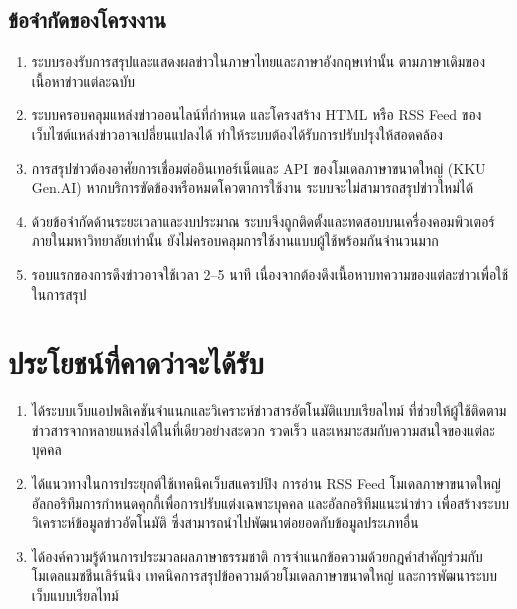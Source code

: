 \subsection{ข้อจำกัดของโครงงาน}

\begin{enumerate}[label=\arabic*)]
    \item ระบบรองรับการสรุปและแสดงผลข่าวในภาษาไทยและภาษาอังกฤษเท่านั้น ตามภาษาเดิมของเนื้อหาข่าวแต่ละฉบับ
    \item ระบบครอบคลุมแหล่งข่าวออนไลน์ที่กำหนด และโครงสร้าง HTML หรือ RSS Feed ของเว็บไซต์แหล่งข่าวอาจเปลี่ยนแปลงได้ ทำให้ระบบต้องได้รับการปรับปรุงให้สอดคล้อง
    \item การสรุปข่าวต้องอาศัยการเชื่อมต่ออินเทอร์เน็ตและ API ของโมเดลภาษาขนาดใหญ่ (KKU Gen.AI) หากบริการขัดข้องหรือหมดโควตาการใช้งาน ระบบจะไม่สามารถสรุปข่าวใหม่ได้
    \item ด้วยข้อจำกัดด้านระยะเวลาและงบประมาณ ระบบจึงถูกติดตั้งและทดสอบบนเครื่องคอมพิวเตอร์ภายในมหาวิทยาลัยเท่านั้น ยังไม่ครอบคลุมการใช้งานแบบผู้ใช้พร้อมกันจำนวนมาก
    \item รอบแรกของการดึงข่าวอาจใช้เวลา 2--5 นาที เนื่องจากต้องดึงเนื้อหาบทความของแต่ละข่าวเพื่อใช้ในการสรุป
\end{enumerate}

\section{ประโยชน์ที่คาดว่าจะได้รับ}

\begin{enumerate}[label=\arabic*)]
    \item ได้ระบบเว็บแอปพลิเคชันจำแนกและวิเคราะห์ข่าวสารอัตโนมัติแบบเรียลไทม์ ที่ช่วยให้ผู้ใช้ติดตามข่าวสารจากหลายแหล่งได้ในที่เดียวอย่างสะดวก รวดเร็ว และเหมาะสมกับความสนใจของแต่ละบุคคล
    \item ได้แนวทางในการประยุกต์ใช้เทคนิคเว็บสแครปปิง การอ่าน RSS Feed โมเดลภาษาขนาดใหญ่ อัลกอริทึมการกำหนดคุกกี้เพื่อการปรับแต่งเฉพาะบุคคล และอัลกอริทึมแนะนำข่าว เพื่อสร้างระบบวิเคราะห์ข้อมูลข่าวอัตโนมัติ ซึ่งสามารถนำไปพัฒนาต่อยอดกับข้อมูลประเภทอื่น
    \item ได้องค์ความรู้ด้านการประมวลผลภาษาธรรมชาติ การจำแนกข้อความด้วยกฎคำสำคัญร่วมกับโมเดลแมชชีนเลิร์นนิง เทคนิคการสรุปข้อความด้วยโมเดลภาษาขนาดใหญ่ และการพัฒนาระบบเว็บแบบเรียลไทม์
\end{enumerate}
